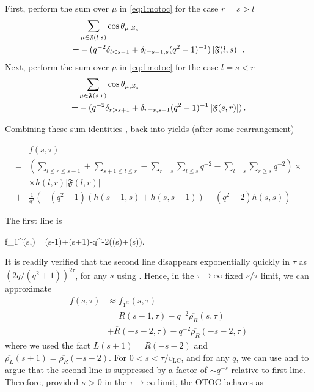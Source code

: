 \documentclass[aps,prb,twocolumn,superscriptaddress]{revtex4-1}
\begin{document}
First, perform the sum over $\mu$ in \eqref{eq:1motoc} for the case $r=s>l$
\begin{align}
&\sum_{\mu\in\mathfrak{F}(l,s)}\cos\theta_{\mu,Z_{s}}\nonumber \\
=& -(q^{-2}\delta_{l<s-1}+\delta_{l=s-1,s}(q^{2}-1)^{-1})\left|\mathfrak{F}(l,s)\right| \,. \label{eq:r>l}
\end{align}
Next, perform the sum over $\mu$ in \eqref{eq:1motoc} for the case $l=s<r$
\begin{align}
&\sum_{\mu\in\mathfrak{F}(s,r)}\cos\theta_{\mu,Z_{s}}  \nonumber\\
  =&-(q^{-2}\delta_{r>s+1}+\delta_{r=s,s+1}(q^{2}-1)^{-1}\left|\mathfrak{F}(s,r)\right|) \,. \label{eq:l<r}
\end{align}






Combining these sum identities ,  back into  yields
(after some rearrangement)

\begin{align*}
&f(s,\tau)\nonumber \\
 =&\left(\sum_{l\leq r\leq s-1}+\sum_{s+1\leq l\leq r}-\sum_{r=s}\sum_{l\leq s}q^{-2}-\sum_{l=s}\sum_{r\geq s}q^{-2}\right)\times \\
 &\times h(l,r)\left|\mathfrak{F}(l,r)\right|\\
  +&\frac{1}{q^{2}}\left(-(q^{2}-1)(h(s-1,s)+h(s,s+1))+\left(q^{2}-2\right)h(s,s)\right)
\end{align*}






The first line is

\be
f_{1^{}}(s,\tau)  =(s-1)+(s+1)-q^{-2}\left(\left(s\right)+\left(s\right)\right).
\ee

It is readily verified that the second line disappears exponentially quickly in $\tau$ as $(2q/(q^2+1))^{2\tau}$, for any
$s$ using  . Hence, in the $\tau\rightarrow\infty$ fixed $s/\tau$ limit,
we can approximate 
\begin{align}
f(s,\tau) & \approx f_{1^{\text{st}}}(s,\tau)\nonumber\\
 & =\overline{R}(s-1,\tau)-q^{-2}\overline{\rho_{R}}\left(s,\tau\right)\\
 & +\overline{R}(-s-2,\tau)-q^{-2}\overline{\rho_{R}}\left(-s-2,\tau\right)
\end{align}
where we used the fact $\overline{L}(s+1)=\overline{R}(-s-2)$ and
$\overline{\rho_{L}}(s+1)=\overline{\rho_{R}}(-s-2)$. For $0<s<\tau/v_{\text{LC}}$,
and for any $q$, we can use  and
 to argue that the second
line is suppressed by a factor of $\sim q^{-s}$ relative to first
line. Therefore, provided $\kappa>0$ in the $\tau\rightarrow\infty$
limit, the OTOC behaves as
\end{document}
